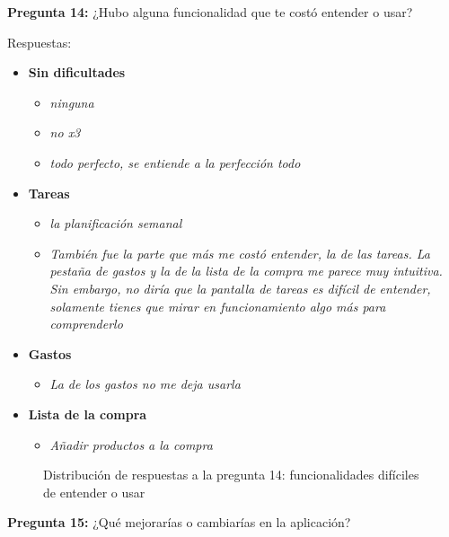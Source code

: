 \textbf{Pregunta 14:} ¿Hubo alguna funcionalidad que te costó entender o usar?

Respuestas:

\begin{itemize}
    \item \textbf{Sin dificultades}
    \begin{itemize}
        \item \textit{ninguna}
        \item \textit{no x3}
        \item \textit{todo perfecto, se entiende a la perfección todo}
    \end{itemize}
    \item \textbf{Tareas}
    \begin{itemize}
        \item \textit{la planificación semanal}
        \item \textit{También fue la parte que más me costó entender, la de las tareas. La pestaña de gastos y la de la lista de la compra me parece muy intuitiva. Sin embargo, no diría que la pantalla de tareas es difícil de entender, solamente tienes que mirar en funcionamiento algo más para comprenderlo} 
    \end{itemize}
    \item \textbf{Gastos}
    \begin{itemize}
        \item \textit{La de los gastos no me deja usarla}
    \end{itemize}
    \item \textbf{Lista de la compra}
    \begin{itemize}
        \item \textit{Añadir productos a la compra}
    \end{itemize}
\end{itemize}

\begin{figure}[H]
    \centering
    \caption{Distribución de respuestas a la pregunta 14: funcionalidades difíciles de entender o usar}
    \label{fig:funcionalidad-dificil}
\end{figure}

\textbf{Pregunta 15:} ¿Qué mejorarías o cambiarías en la aplicación?

